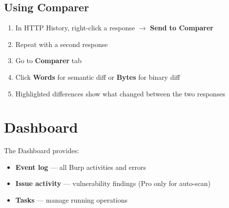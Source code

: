 \subsection{Using Comparer}

\begin{enumerate}
  \item In HTTP History, right-click a response $\to$ \textbf{Send to Comparer}
  \item Repeat with a second response
  \item Go to \textbf{Comparer} tab
  \item Click \textbf{Words} for semantic diff or \textbf{Bytes} for binary diff
  \item Highlighted differences show what changed between the two responses
\end{enumerate}


\section{Dashboard}

The Dashboard provides:
\begin{itemize}
  \item \textbf{Event log} — all Burp activities and errors
  \item \textbf{Issue activity} — vulnerability findings (Pro only for auto-scan)
  \item \textbf{Tasks} — manage running operations
\end{itemize}

